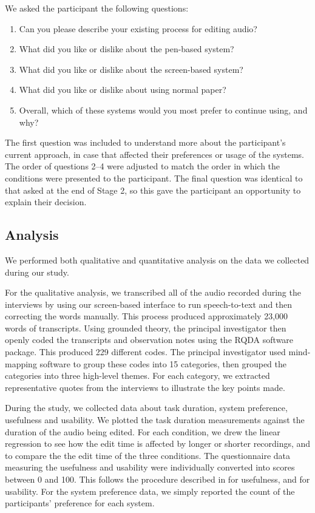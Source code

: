 We asked the participant the following questions:

{\singlespacing
  \begin{enumerate}
    \item Can you please describe your existing process for editing audio?
    \item What did you like or dislike about the pen-based system?
    \item What did you like or dislike about the screen-based system?
    \item What did you like or dislike about using normal paper?
    \item Overall, which of these systems would you most prefer to continue using, and why?
  \end{enumerate}
}

The first question was included to understand more about the participant's current approach, in case that affected
their preferences or usage of the systems.  The order of questions 2--4 were adjusted to match the order in which the
conditions were presented to the participant.  The final question was identical to that asked at the end of Stage 2, so
this gave the participant an opportunity to explain their decision.

\subsection{Analysis}

We performed both qualitative and quantitative analysis on the data we collected during our study.

For the qualitative analysis, we transcribed all of the audio recorded during the interviews by using our screen-based
interface to run speech-to-text and then correcting the words manually. This process produced approximately 23,000
words of transcripts. Using grounded theory, the principal investigator then openly coded the transcripts and
observation notes using the RQDA software package. This produced 229 different codes. The principal investigator used
mind-mapping software to group these codes into 15 categories, then grouped the categories into three high-level
themes. For each category, we extracted representative quotes from the interviews to illustrate the key points made.

During the study, we collected data about task duration, system preference, usefulness and usability.  We plotted the
task duration measurements against the duration of the audio being edited. For each condition, we drew the linear
regression to see how the edit time is affected by longer or shorter recordings, and to compare the the edit time of
the three conditions.  The questionnaire data measuring the usefulness and usability were individually converted into
scores between 0 and 100.  This follows the procedure described in \citet{Davis1989} for usefulness, and
\citet{Brooke1996} for usability.  For the system preference data, we simply reported the count of the participants'
preference for each system.


